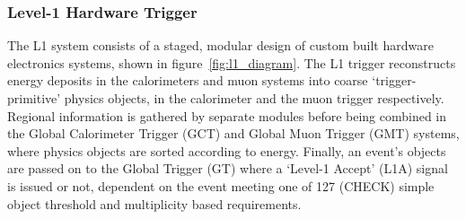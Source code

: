 \subsubsection{Level-1 Hardware Trigger}

The L1 system consists of a staged, modular design of custom built hardware 
electronics systems, shown in figure~\ref{fig:l1_diagram}. 
The L1 trigger reconstructs energy deposits in the calorimeters and muon systems
into coarse `trigger-primitive' physics objects, in the calorimeter and the muon 
trigger respectively. Regional information is gathered by separate modules 
before being combined in the Global Calorimeter Trigger (GCT) and Global Muon 
Trigger (GMT) systems, where physics objects are sorted according to energy. 
Finally, an event's objects are passed on to the Global Trigger (GT) where a 
`Level-1 Accept' (L1A) signal is issued or not, dependent on the event meeting 
one of 127 (CHECK) simple object threshold and multiplicity based requirements.

